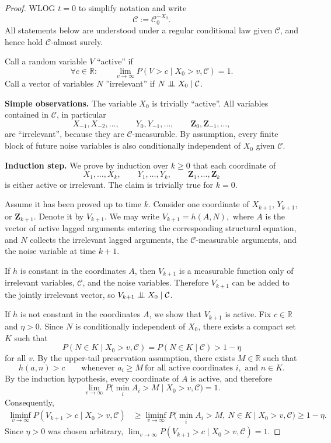 \documentclass[a4paper,11pt]{article}
\newcommand{\indep}{\perp\kern-5.5pt\perp}
\begin{document}
\begin{proof}
WLOG \(t=0\) to simplify notation and write
\[
    \mathcal C:=\mathcal C_0^{-X_0}.
\]
All statements below are understood under a regular conditional law given \(\mathcal C\), and hence hold \(\mathcal C\)-almost surely. 

Call a random variable \(V\) ``active'' if
\[
   \forall c\in\mathbb R:\qquad
   \lim_{v\to\infty}
   P(V>c\mid X_0>v,\mathcal C)=1 .
\]
Call a vector of variables \(N\) ''irrelevant'' if \(N\indep X_0\mid \mathcal C\).

\textbf{Simple observations. }The variable \(X_0\) is trivially ``active''. All variables contained in \(\mathcal C\), in particular
\[
   X_{-1},X_{-2},\ldots,\qquad
   Y_0,Y_{-1},\ldots,\qquad
   \mathbf Z_0,\mathbf Z_{-1},\ldots,
\]
are ``irrelevant'', because they are \(\mathcal C\)-measurable. By assumption, every finite block of future
noise variables is also conditionally independent of \(X_0\) given \(\mathcal C\).

\textbf{Induction step. }We prove by induction over \(k\ge 0\) that each coordinate of
\[
   X_1,\ldots,X_k,\qquad
   Y_1,\ldots,Y_k,\qquad
   \mathbf Z_1,\ldots,\mathbf Z_k
\]
is either active or irrelevant. The claim is trivially true for \(k=0\).

Assume it has been proved up to time \(k\). Consider one coordinate
of \(X_{k+1}\), \(Y_{k+1}\), or \(\mathbf Z_{k+1}\). Denote it by \(V_{k+1}\). We may
write
\(
   V_{k+1}=h(A,N),
\)
where \(A\) is the vector of active lagged arguments entering the
corresponding structural equation, and \(N\) collects the irrelevant
lagged arguments, the \(\mathcal C\)-measurable arguments, and the
noise variable at time \(k+1\).

If \(h\) is constant in the coordinates \(A\), then \(V_{k+1}\) is a
measurable function only of irrelevant variables, \(\mathcal C\), and the
noise variables. Therefore \(V_{k+1}\) can be added to the jointly irrelevant
vector, so \(V_{k+1}\indep X_0\mid\mathcal C\).

If \(h\) is not constant in the coordinates \(A\), we show that
\(V_{k+1}\) is active. Fix \(c\in\mathbb R\) and \(\eta>0\). Since \(N\)
is conditionally independent of \(X_0\), there exists a compact set
\(K\) such that
\[
   P(N\in K\mid X_0>v,\mathcal C)
   =P(N\in K\mid \mathcal C)>1-\eta
\]
for all \(v\). By the upper-tail preservation assumption, there exists
\(M\in\mathbb R\) such that
\[
   h(a,n)>c
   \qquad
   \text{whenever } a_i\ge M\ \text{for all active coordinates }i,
   \text{ and } n\in K .
\]
By the induction hypothesis, every coordinate of \(A\) is active, and
therefore
\[
   \lim_{v\to\infty}
   P\bigl(\min_i A_i>M\mid X_0>v,\mathcal C\bigr)=1 .
\]
Consequently,
\[
\begin{split}
   \liminf_{v\to\infty}
   P(V_{k+1}>c\mid X_0>v,\mathcal C)
   &\ge
   \liminf_{v\to\infty}
   P\bigl(\min_i A_i>M,\ N\in K
       \mid X_0>v,\mathcal C\bigr)\ge 1-\eta .
\end{split}
\]
Since \(\eta>0\) was chosen arbitrary,
$   \lim_{v\to\infty}
   P(V_{k+1}>c\mid X_0>v,\mathcal C)=1 .$


\end{proof}
\end{document}
